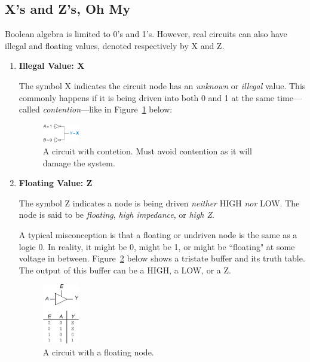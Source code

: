 \documentclass[12pt]{article}
\begin{document}
\subsection{X's and Z's, Oh My}

Boolean algebra is limited to 0's and 1's. However, real circuits can also have illegal and floating values, denoted respectively by X and Z.

\begin{enumerate}
  \item \textbf{Illegal Value: X}

  The symbol X indicates the circuit node has an \textit{unknown} or \textit{illegal} value. This commonly happens if it is being driven into both 0 and 1 at the same time---called \textit{contention}---like in Figure~\ref{figure:3} below:

  \begin{figure}[h!]
    \centering
    \includegraphics[width=0.15\textwidth]{circuit_with_contention.png}
    \caption{A circuit with contetion. Must avoid contention as it will damage the system.}
    \label{figure:3}
  \end{figure}

  \item \textbf{Floating Value: Z}

  The symbol Z indicates a node is being driven \textit{neither} HIGH \textit{nor} LOW. The node is said to be \textit{floating}, \textit{high impedance}, or \textit{high Z}.

  A typical misconception is that a floating or undriven node is the same as a logic 0. In reality, it might be 0, might be 1, or might be ``floating" at some voltage in between. Figure~\ref{figure:4} below shows a tristate buffer and its truth table. The output of this buffer can be a HIGH, a LOW, or a Z.

  \begin{figure}[h!]
    \centering
    \includegraphics[width=0.15\textwidth]{circuit_with_floating.png}
    \caption{A circuit with a floating node.}
    \label{figure:4}
  \end{figure}
\end{enumerate}
\end{document}
